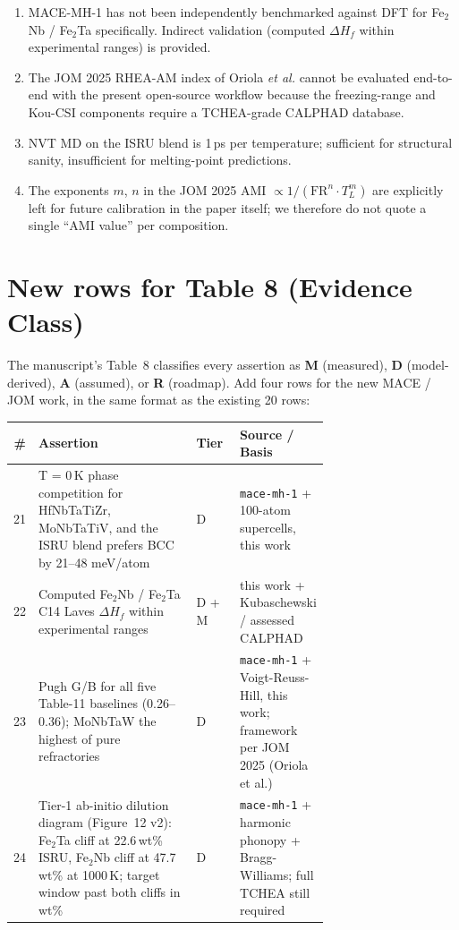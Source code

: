 \documentclass[11pt,a4paper]{article}
\begin{document}
\begin{enumerate}[(C1)]
        internally consistent.
  \item MACE-MH-1 has not been independently benchmarked against DFT for
        Fe$_2$Nb / Fe$_2$Ta specifically. Indirect validation (computed
        $\Delta H_f$ within experimental ranges) is provided.
  \item The JOM 2025 RHEA-AM index of Oriola \emph{et al.} cannot be
        evaluated end-to-end with the present open-source workflow because
        the freezing-range and Kou-CSI components require a TCHEA-grade
        CALPHAD database.
  \item NVT MD on the ISRU blend is 1\,ps per temperature; sufficient for
        structural sanity, insufficient for melting-point predictions.
  \item The exponents $m$, $n$ in the JOM 2025 AMI $\propto 1/(\text{FR}^n
        \cdot T_L^m)$ are explicitly left for future calibration in the
        paper itself; we therefore do not quote a single ``AMI value'' per
        composition.
\end{enumerate}

\section{New rows for Table 8 (Evidence Class)}

The manuscript's Table~8 classifies every assertion as \textbf{M} (measured),
\textbf{D} (model-derived), \textbf{A} (assumed), or \textbf{R} (roadmap).
Add four rows for the new MACE / JOM work, in the same format as the existing
20 rows:

\begin{center}
{\small\setlength{\tabcolsep}{4pt}
\begin{tabular}{rp{0.50\linewidth}lp{0.20\linewidth}}
\toprule
\textbf{\#} & \textbf{Assertion} & \textbf{Tier} & \textbf{Source / Basis}\\
\midrule
21 & T = 0\,K phase competition for HfNbTaTiZr, MoNbTaTiV, and the ISRU
     blend prefers BCC by 21--48 meV/atom & D &
     \texttt{mace-mh-1} + 100-atom supercells, this work\\
22 & Computed Fe$_2$Nb / Fe$_2$Ta C14 Laves $\Delta H_f$ within
     experimental ranges & D + M &
     this work + Kubaschewski / assessed CALPHAD\\
23 & Pugh G/B for all five Table-11 baselines (0.26--0.36); MoNbTaW the
     highest of pure refractories & D &
     \texttt{mace-mh-1} + Voigt-Reuss-Hill, this work; framework per
     JOM 2025 (Oriola et al.)\\
24 & Tier-1 ab-initio dilution diagram (Figure~12 v2): Fe$_2$Ta cliff at
     22.6\,wt\% ISRU, Fe$_2$Nb cliff at 47.7\,wt\% at 1000\,K; target
     window past both cliffs in wt\% & D &
     \texttt{mace-mh-1} + harmonic phonopy + Bragg-Williams; full TCHEA
     still required\\
\bottomrule
\end{tabular}}
\end{center}
\end{document}
